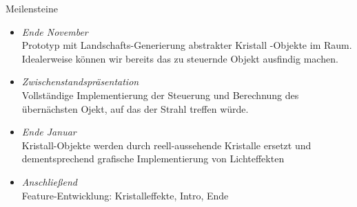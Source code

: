 \begin{frame}{Meilensteine}
	\begin{itemize}
		\item \emph{Ende November}\\
		Prototyp mit Landschafts-Generierung abstrakter \glqq Kristall \grqq -Objekte im Raum. Idealerweise können wir bereits das zu steuernde Objekt ausfindig machen.
		\item \emph{Zwischenstandspräsentation}\\
		Vollständige Implementierung der Steuerung und Berechnung des übernächsten Ojekt, auf das der Strahl treffen würde.
		\item \emph{Ende Januar}\\
		Kristall-Objekte werden durch reell-aussehende Kristalle ersetzt und dementsprechend grafische Implementierung von Lichteffekten
		\item \emph{Anschließend}\\
		Feature-Entwicklung: Kristalleffekte, Intro, Ende
	\end{itemize}
\end{frame}

%

